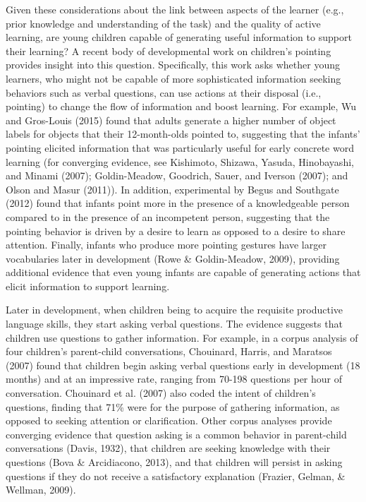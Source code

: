 \documentclass[english,floatsintext,man]{apa6}
\theoremstyle{definition}
\theoremstyle{definition}
\theoremstyle{definition}
\theoremstyle{remark}
\begin{document}
Given these considerations about the link between aspects of the learner
(e.g., prior knowledge and understanding of the task) and the quality of
active learning, are young children capable of generating useful
information to support their learning? A recent body of developmental
work on children's pointing provides insight into this question.
Specifically, this work asks whether young learners, who might not be
capable of more sophisticated information seeking behaviors such as
verbal questions, can use actions at their disposal (i.e., pointing) to
change the flow of information and boost learning. For example, Wu and
Gros-Louis (2015) found that adults generate a higher number of object
labels for objects that their 12-month-olds pointed to, suggesting that
the infants' pointing elicited information that was particularly useful
for early concrete word learning (for converging evidence, see
Kishimoto, Shizawa, Yasuda, Hinobayashi, and Minami (2007);
Goldin-Meadow, Goodrich, Sauer, and Iverson (2007); and Olson and Masur
(2011)). In addition, experimental by Begus and Southgate (2012) found
that infants point more in the presence of a knowledgeable person
compared to in the presence of an incompetent person, suggesting that
the pointing behavior is driven by a desire to learn as opposed to a
desire to share attention. Finally, infants who produce more pointing
gestures have larger vocabularies later in development (Rowe \&
Goldin-Meadow, 2009), providing additional evidence that even young
infants are capable of generating actions that elicit information to
support learning.

Later in development, when children being to acquire the requisite
productive language skills, they start asking verbal questions. The
evidence suggests that children use questions to gather information. For
example, in a corpus analysis of four children's parent-child
conversations, Chouinard, Harris, and Maratsos (2007) found that
children begin asking verbal questions early in development (18 months)
and at an impressive rate, ranging from 70-198 questions per hour of
conversation. Chouinard et al. (2007) also coded the intent of
children's questions, finding that 71\% were for the purpose of
gathering information, as opposed to seeking attention or clarification.
Other corpus analyses provide converging evidence that question asking
is a common behavior in parent-child conversations (Davis, 1932), that
children are seeking knowledge with their questions (Bova \&
Arcidiacono, 2013), and that children will persist in asking questions
if they do not receive a satisfactory explanation (Frazier, Gelman, \&
Wellman, 2009).
\end{document}
